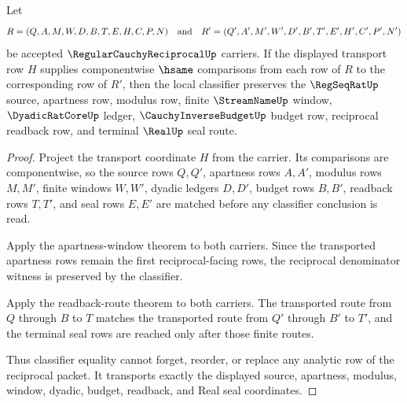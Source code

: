 \begin{theorem}
\label{thm:regular-cauchy-reciprocal-classifier-stability}
Let
$$
R=(Q,A,M,W,D,B,T,E,H,C,P,N)
\quad\hbox{and}\quad
R'=(Q',A',M',W',D',B',T',E',H',C',P',N')
$$
be accepted $\RegularCauchyReciprocalUp$ carriers. If the displayed transport row $H$ supplies componentwise $\hsame$ comparisons from each row of $R$ to the corresponding row of $R'$, then the local classifier preserves the $\RegSeqRatUp$ source, apartness row, modulus row, finite $\StreamNameUp$ window, $\DyadicRatCoreUp$ ledger, $\CauchyInverseBudgetUp$ budget row, reciprocal readback row, and terminal $\RealUp$ seal route.
\end{theorem}
\begin{proof}
Project the transport coordinate $H$ from the carrier. Its comparisons are componentwise, so the source rows $Q,Q'$, apartness rows $A,A'$, modulus rows $M,M'$, finite windows $W,W'$, dyadic ledgers $D,D'$, budget rows $B,B'$, readback rows $T,T'$, and seal rows $E,E'$ are matched before any classifier conclusion is read.

Apply the apartness-window theorem to both carriers. Since the transported apartness rows remain the first reciprocal-facing rows, the reciprocal denominator witness is preserved by the classifier.

Apply the readback-route theorem to both carriers. The transported route from $Q$ through $B$ to $T$ matches the transported route from $Q'$ through $B'$ to $T'$, and the terminal seal rows are reached only after those finite routes.

Thus classifier equality cannot forget, reorder, or replace any analytic row of the reciprocal packet. It transports exactly the displayed source, apartness, modulus, window, dyadic, budget, readback, and Real seal coordinates.
\end{proof}

